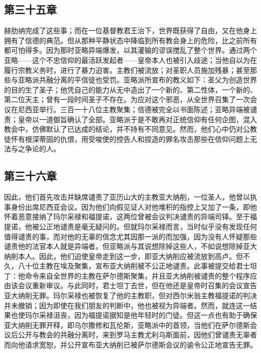 
\subsection{第三十五章}

赫肋纳完成了这些事；而在一位基督教君王治下，世界既获得了自由，又在他身上拥有了信德的典范。但从那种平静状态中降临到所有教会身上的危险，比之前所有都可怕得多。因为那时亚略异端爆发，以其灌输的谬误搅乱了整个世界。通过两个亚略——这个不忠信仰的最活跃发起者——皇帝本人也被引入歧途；当他自以为在履行宗教义务时，进行了暴力迫害。主教们被流放；对圣职人员施加残暴；甚至那些与亚略派共融分离的平信徒也受罚。亚略派所宣布的教义如下：圣父为创造世界的目的生了圣子；他凭自己的能力从无中造出了一个新的、第二性体，一个新的、第二位天主；曾有一段时间圣子不存在。为应对这个邪恶，从全世界召集了一次会议在尼西亚举行。三百一十八位主教聚集；信德被完全以书面陈述；亚略异端被谴责；皇帝以一道御旨确认了全部。亚略派于是不敢再对正统信仰有任何企图，混入教会中，仿佛默认了已达成的结论，并不持有不同意见。然而，他们心中仍对公教徒怀有根深蒂固的仇恨，用受唆使的控告人和捏造的罪名攻击那些在信仰问题上无法与之争论的人。\par


\subsection{第三十六章}

因此，他们首先攻击并缺席谴责了亚历山大的主教亚大纳削，一位圣人，他曾以执事身份出席尼西亚会议。因为他们向假见证人对他堆积的指控上又加了一条，即他怀着恶意接纳了玛尔采禄和福提诺，这两位曾被会议判决谴责的异端司铎。至于福提诺，他被公正地谴责是毫无疑问的。但就玛尔采禄而言，当时似乎没有发现任何值得谴责的事，而对他的无辜的信念尤其因那一派的而加强，因为没有人怀疑那些谴责他的法官本人就是异端者。但亚略派与其说想除掉这些人，不如说想除掉亚大纳削本人。因此，他们迫使皇帝走到这一步，即亚大纳削应被流放到高卢。但不久，八十位主教在埃及聚集，宣布亚大纳削被不公正地谴责。此事被提交给君士坦丁：他命令来自全世界的主教在萨尔德斯聚集，并且亚大纳削被谴责的整个程序应由该会议重新审议。与此同时，君士坦丁去世，但在他还是皇帝时召集的会议宣告亚大纳削无罪。玛尔采禄也被恢复了他的主教职，但对西尔米翁主教福提诺的判决并未撤销；因为即使在我们朋友的判断中，他也被视为异端者。然而，就连这一结果也使玛尔采禄沮丧，因为福提诺据知是他年轻时的门徒。但这一点也有助于确保亚大纳削无罪开释，即乌尔撒修和瓦伦斯，亚略派中的首领，当他们在萨尔德斯会议后公开与教会的共融分离时，来到罗马主教尤利乌斯面前，因他们曾谴责无辜者而向他请求宽恕，并公开宣布亚大纳削已被萨尔德斯会议的谕令公正地宣告无罪。\par

